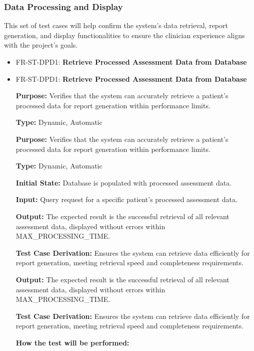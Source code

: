 \documentclass[12pt, titlepage]{article}
\begin{document}
\subsubsection{Data Processing and Display}

\hspace{2em}This set of test cases will help confirm the system's data retrieval, report generation, 
and display functionalities to ensure the clinician experience aligns with the project’s goals.

\begin{itemize}
  \item FR-ST-DPD1: \textbf{Retrieve Processed Assessment Data from Database}
  \item FR-ST-DPD1: \textbf{Retrieve Processed Assessment Data from Database}
  \begin{mdframed}[linewidth=0.5mm]
      \textbf{Purpose:} Verifies that the system can accurately retrieve a patient’s processed data for report generation within performance limits. \par
      \textbf{Type:} Dynamic, Automatic \par
      \textbf{Purpose:} Verifies that the system can accurately retrieve a patient’s processed data for report generation within performance limits. \par
      \textbf{Type:} Dynamic, Automatic \par
      \textbf{Initial State:} Database is populated with processed assessment data. \par
      \textbf{Input:} Query request for a specific patient’s processed assessment data. \par
      \textbf{Output:} The expected result is the successful retrieval of all relevant assessment data, displayed without errors within MAX\_PROCESSING\_TIME. \par
      \textbf{Test Case Derivation:} Ensures the system can retrieve data efficiently for report generation, meeting retrieval speed and completeness requirements. \par
      \textbf{Output:} The expected result is the successful retrieval of all relevant assessment data, displayed without errors within MAX\_PROCESSING\_TIME. \par
      \textbf{Test Case Derivation:} Ensures the system can retrieve data efficiently for report generation, meeting retrieval speed and completeness requirements. \par
      \textbf{How the test will be performed:}
      \begin{enumerate}[noitemsep]

\end{enumerate}
\end{mdframed}
\end{itemize}
\end{document}
